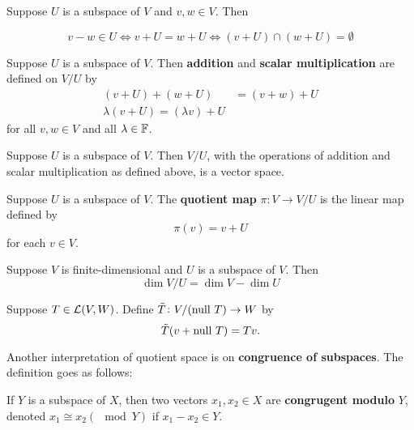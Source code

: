\documentclass{extarticle}
\begin{document}
\begin{lemma}
    Suppose \(U\) is a subspace of \(V\) and \(v, w \in V\). Then 

    \[v - w \in U \Leftrightarrow v + U = w + U \Leftrightarrow (v + U) \cap (w + U) = \emptyset\]
\end{lemma}

\begin{definition}
    Suppose \(U\) is a subspace of \(V\). Then \textbf{addition} and \textbf{scalar multiplication} 
    are defined on \(V / U\) by 
    \begin{align*}
        (v + U) + (w + U) &= (v+w) + U \\ 
        \lambda (v+U) = (\lambda v) + U 
    \end{align*}
    for all \(v, w \in V\) and all \(\lambda \in \mathbb{F}\). 
\end{definition}


\begin{thm}
    Suppose \(U\) is a subspace of \(V\). Then \(V / U\), with the operations of addition and 
    scalar multiplication as defined above, is a vector space. 
\end{thm}

\begin{definition}
    Suppose \(U\) is a subspace of \(V\). The \textbf{quotient map} \(\pi \colon 
    V \to V / U\) is the linear map defined by 
    \[\pi(v) = v + U\]
    for each \(v \in V\). 
\end{definition}


\begin{thm}
    Suppose \(V\) is finite-dimensional and \(U\) is a subspace of \(V\). Then 
    \[\dim V/U = \dim V - \dim U\]
\end{thm}


\begin{definition}
    Suppose \(T \in \mathcal{L}(V, W)\). Define \(\Tilde{T} \colon V / (\text{null } T) \to W\) by 
    \[\Tilde{T} (v + \text{null } T) = Tv.\]
\end{definition}


Another interpretation of quotient space is on \textbf{congruence of subspaces}. The definition goes 
as follows:

If \(Y\) is a subspace of \(X\), then two vectors \(x_1, x_2 \in X\) are \textbf{congrugent modulo} \(Y\),
denoted \(x_1 \cong x_2 (\mod Y)\) if \(x_1 - x_2 \in Y\).
\end{document}
